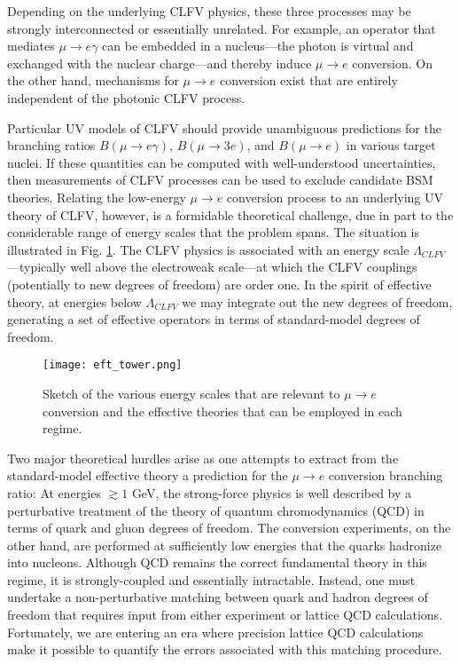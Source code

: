 \documentclass{book}[letterpaper,12pt]
\begin{document}
Depending on the underlying CLFV physics, these three processes may be strongly interconnected or essentially unrelated. For example, an operator that mediates $\mu\rightarrow e\gamma$ can be embedded in a nucleus---the photon is virtual and exchanged with the nuclear charge---and thereby induce $\mu\rightarrow e$ conversion. On the other hand, mechanisms for $\mu\rightarrow e$ conversion exist that are entirely independent of the photonic CLFV process. 

Particular UV models of CLFV should provide unambiguous predictions for the branching ratios $B(\mu\rightarrow e\gamma)$, $B(\mu\rightarrow 3e)$, and $B(\mu\rightarrow e)$ in various target nuclei. If these quantities can be computed with well-understood uncertainties, then measurements of CLFV processes can be used to exclude candidate BSM theories. Relating the low-energy $\mu\rightarrow e$ conversion process to an underlying UV theory of CLFV, however, is a formidable theoretical challenge, due in part to the considerable range of energy scales that the problem spans. The situation is illustrated in Fig. \ref{fig:eft_tower}. The CLFV physics is associated with an energy scale $\Lambda_{CLFV}$---typically well above the electroweak scale---at which the CLFV couplings (potentially to new degrees of freedom) are order one. In the spirit of effective theory, at energies below $\Lambda_{CLFV}$ we may integrate out the new degrees of freedom, generating a set of effective operators in terms of standard-model degrees of freedom.  

\begin{figure}
\centering
\texttt{[image: eft\_tower.png]}
\caption{Sketch of the various energy scales that are relevant to $\mu\rightarrow e$ conversion and the effective theories that can be employed in each regime.}
\label{fig:eft_tower}
\end{figure}

Two major theoretical hurdles arise as one attempts to extract from the standard-model effective theory a prediction for the $\mu\rightarrow e$ conversion branching ratio: At energies $\gtrsim 1$ GeV, the strong-force physics is well described by a perturbative treatment of the theory of quantum chromodynamics (QCD) in terms of quark and gluon degrees of freedom. The conversion experiments, on the other hand, are performed at sufficiently low energies that the quarks hadronize into nucleons. Although QCD remains the correct fundamental theory in this regime, it is strongly-coupled and essentially intractable. Instead, one must undertake a non-perturbative matching between quark and hadron degrees of freedom that requires input from either experiment or lattice QCD calculations. Fortunately, we are entering an era where precision lattice QCD calculations make it possible to quantify the errors associated with this matching procedure. 
\end{document}
